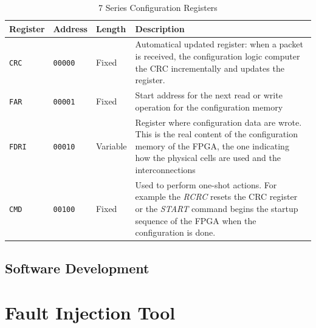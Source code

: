 \begin{table}[H]
\centering
    \begin{tabular}{p{2cm}|p{2cm}|p{1.5cm}|p{7cm}}
        \textbf{Register} & \textbf{Address} & \textbf{Length} & \textbf{Description} \\
        \hline
        \texttt{CRC} & \texttt{00000} & Fixed & Automatical updated register: when a packet is received, the configuration logic computer the CRC incrementally and updates the register. \\
        \hline
        \texttt{FAR} & \texttt{00001} & Fixed & Start address for the next read or write operation for the configuration memory\\
        \hline
        \texttt{FDRI} & \texttt{00010} & Variable & Register where configuration data are wrote. This is the real content of the configuration memory of the FPGA, the one indicating how the physical cells are used and the interconnections\\
        \hline
        \texttt{CMD} & \texttt{00100} & Fixed & Used to perform one-shot actions. For example the \textit{RCRC} resets the CRC register or the \textit{START} command begins the startup sequence of the FPGA when the configuration is done.\\
    \end{tabular}
\caption{7 Series Configuration Registers}
\label{tab:conf_regs}
\end{table}


\subsection{Software Development}
\section{Fault Injection Tool}